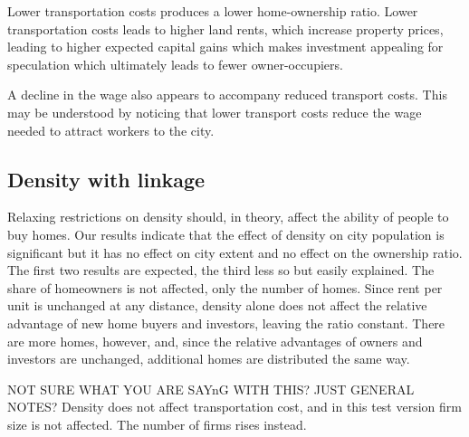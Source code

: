{Lower transportation costs produces a lower home-ownership ratio. Lower transportation costs leads to higher land rents, which increase  property prices, leading to higher expected capital gains which makes investment appealing for speculation which ultimately leads to fewer owner-occupiers.

A decline in the wage also appears to accompany reduced transport costs. This may be understood by noticing that lower transport costs reduce the wage needed to attract workers to the city. 





\newpage


\subsection{Density with linkage}
Relaxing restrictions on density should, in theory, affect the ability of people to buy homes. Our results indicate that the effect of density on city population is significant but it has no effect on city extent and no effect on the ownership ratio. The first two results are expected, the third less so but easily explained. The share of homeowners is not affected, only the number of homes. Since rent per unit is unchanged at any distance, density alone does not affect the relative advantage of new home buyers and investors, leaving the ratio constant. There are more homes, however, and, since the relative advantages of owners and investors are unchanged, additional homes are distributed the same way.  


{\color{red} NOT SURE WHAT YOU ARE SAYnG WITH THIS? JUST GENERAL NOTES? Density does not affect transportation cost, and in this test version firm size is not affected. The number of firms rises instead. }

}
